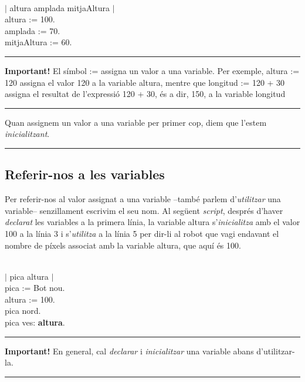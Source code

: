 \noindent
\textsf{ 
\\
$|$ altura amplada mitjaAltura $|$\\
altura := 100.\\
amplada := 70.\\
mitjaAltura := 60.\\
}

\vspace{3mm}
\noindent
\rule{\textwidth}{2pt}
\noindent
\textbf{Important!}  El símbol \textsf{:=} assigna un valor a una variable. Per exemple, \textsf{altura := 120} assigna el valor \textsf{120} a la variable \textsf{altura}, mentre que \textsf{longitud := 120 + 30} assigna el resultat de l'expressió \textsf{120 + 30}, és a dir, \textsf{150}, a la variable \textsf{longitud}

\noindent
\rule{\textwidth}{2pt}

\noindent
Quan assignem un valor a una variable per primer cop, diem que l'estem \emph{inicialitzant}.

\noindent
\rule{\textwidth}{2pt}

\subsection{Referir-nos a les variables}
Per referir-nos al valor assignat a una variable --també parlem d'\emph{utilitzar} una variable-- senzillament escrivim el seu nom. Al següent \emph{script}, després d'haver \emph{declarat} les variables a la primera línia, la variable \textsf{altura} s'\emph{inicialitza} amb el valor \textsf{100} a  la línia 3 i s'\emph{utilitza} a la línia 5 per dir-li al robot que vagi endavant el nombre de píxels associat amb la variable \textsf{altura}, que aquí és \textsf{100}.

\noindent
\textsf{ 
\\
$|$ pica altura $|$\\
pica := Bot nou.\\
altura := 100.\\
pica nord.\\
pica ves: {\bfseries altura}.
}


\vspace{3mm}
\noindent
\rule{\textwidth}{2pt}
\noindent
\textbf{Important!}  En general, cal \emph{declarar} i \emph{inicialitzar} una variable abans d'utilitzar-la.

\noindent
\rule{\textwidth}{2pt}

